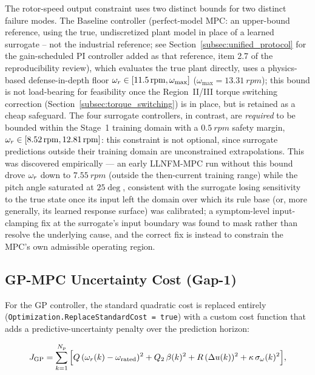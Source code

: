 The rotor-speed output constraint uses two distinct bounds for two
distinct failure modes. The Baseline controller (perfect-model MPC:
an upper-bound reference, using the true, undiscretized plant model
in place of a learned surrogate -- not the industrial reference; see
Section~\ref{subsec:unified_protocol} for the gain-scheduled PI
controller added as that reference, item 2.7 of the reproducibility
review), which evaluates the true
plant directly, uses a physics-based defense-in-depth floor
$\omega_r \in [\SI{11.5}{rpm}, \omega_{\max}]$
($\omega_{\max}=\SI{13.31}{rpm}$); this bound is not load-bearing for
feasibility once the Region~II/III torque switching correction
(Section~\ref{subsec:torque_switching}) is in place, but is retained as a
cheap safeguard. The four surrogate controllers, in contrast, are
\emph{required} to be bounded within the Stage~1 training domain with a
$\SI{0.5}{rpm}$ safety margin, $\omega_r \in [\SI{8.52}{rpm},
\SI{12.81}{rpm}]$: this constraint is not optional, since surrogate
predictions outside their training domain are unconstrained
extrapolations. This was discovered empirically — an early LLNFM-MPC run
without this bound drove $\omega_r$ down to $\SI{7.55}{rpm}$ (outside the
then-current training range) while the pitch angle saturated at
$25\deg$, consistent with the surrogate losing sensitivity to the true
state once its input left the domain over which its rule base (or, more
generally, its learned response surface) was calibrated; a symptom-level
input-clamping fix at the surrogate's input boundary was found to mask
rather than resolve the underlying cause, and the correct fix is instead
to constrain the MPC's own admissible operating region.

\subsection{GP-MPC Uncertainty Cost (Gap-1)}
\label{subsec:gp_uncertainty_cost}

For the GP controller, the standard quadratic cost is replaced entirely \\
(\texttt{Optimization.ReplaceStandardCost = true}) with a custom cost
function that adds a predictive-uncertainty penalty over the prediction
horizon:

\begin{equation}
J_{\text{GP}} = \sum_{k=1}^{N_p} \Big[ Q\,(\omega_r(k)-\omega_{\text{rated}})^2
+ Q_2\,\beta(k)^2 + R\,(\Delta u(k))^2
+ \kappa\,\sigma_{\omega}(k)^2 \Big],
\label{eq:gp_mpc_cost}
\end{equation}

